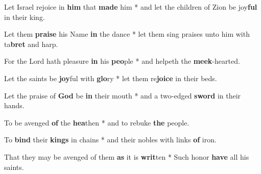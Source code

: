 \begin{multicols}{2}
	Let Israel rejoice in \textbf{him} that \textbf{made} him * and let the children of Zion be joy\textbf{ful} in their king.
	
	Let them \textbf{praise} his Name \textbf{in} the dance * let them sing praises unto him with ta\textbf{bret} and harp.
	
	For the Lord hath pleasure \textbf{in} his \textbf{peo}ple * and helpeth the \textbf{meek}-hearted.
	
	Let the saints be \textbf{joy}ful with \textbf{glo}ry * let them re\textbf{joice} in their beds.
	
	Let the praise of \textbf{God} be \textbf{in} their mouth * and a two-edged \textbf{sword} in their hands.
	
	To be avenged \textbf{of} the \textbf{hea}then * and to rebuke \textbf{the} people.
	
	To \textbf{bind} their \textbf{kings} in chains * and their nobles with links \textbf{of} iron.
	
	That they may be avenged of them \textbf{as} it is\textbf{ writ}ten * Such honor \textbf{have} all his saints.
\end{multicols}